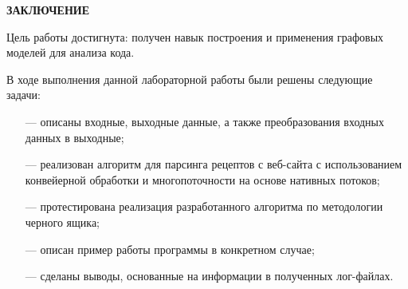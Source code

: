 \begin{center}
    \textbf{ЗАКЛЮЧЕНИЕ}
\end{center}

Цель работы достигнута: получен навык построения и применения графовых моделей для анализа кода.

\vspace{5mm}

В ходе выполнения данной лабораторной работы были решены следующие задачи:
\begin{itemize}
	\item[---] описаны входные, выходные данные, а также преобразования входных данных в выходные;
	\item[---] реализован алгоритм для парсинга рецептов с веб-сайта с использованием конвейерной обработки и многопоточности на основе нативных потоков;
	\item[---] протестирована реализация разработанного алгоритма по методологии черного ящика;
    \item[---] описан пример работы программы в конкретном случае;
    \item[---] сделаны выводы, основанные на информации в полученных лог-файлах.
\end{itemize}
